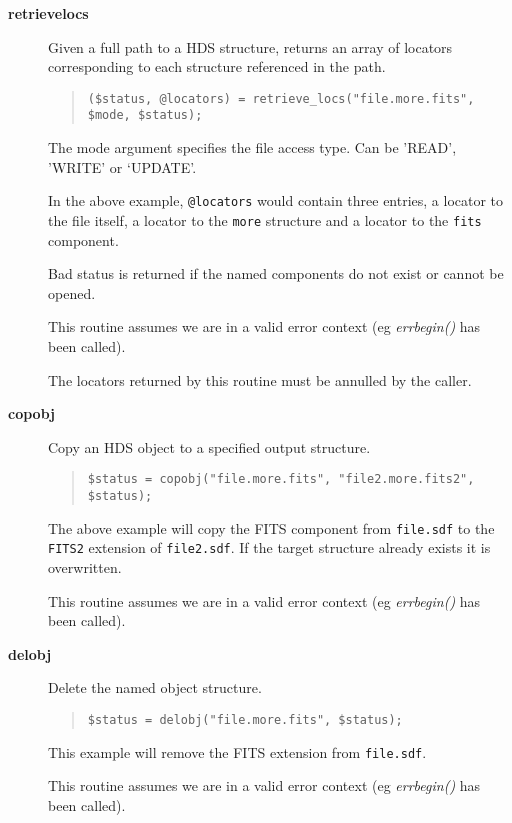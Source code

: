 \documentclass[twoside,11pt]{article}
\newenvironment{myquote}{\begin{quote}\begin{small}}{\end{small}\end{quote}}
\renewcommand{\_}{\texttt{\symbol{95}}}
\begin{document}
\begin{description}

\item[{\bf retrieve\_locs}] \mbox{}

Given a full path to a HDS structure, returns an array of 
locators corresponding to each structure referenced in the path.
\begin{myquote}
\begin{verbatim}
($status, @locators) = retrieve_locs("file.more.fits", $mode, $status);
\end{verbatim}
\end{myquote} %

The mode argument specifies the file access type. Can be 'READ', 'WRITE'
or `UPDATE'.

In the above example, {\tt @locators} would contain three entries,
a locator to the file itself, a locator to the {\tt more} structure
and a locator to the {\tt fits} component.

Bad status is returned if the named components do not exist or cannot
be opened.

This routine assumes we are in a valid error context (eg {\em err\_begin()\/}
has been called).

The locators returned by this routine must be annulled by the caller.

\item[{\bf copobj}] \mbox{}

Copy an HDS object to a specified output structure.
\begin{myquote}
\begin{verbatim}
$status = copobj("file.more.fits", "file2.more.fits2", $status);
\end{verbatim}
\end{myquote}

The above example will copy the FITS component from {\tt file.sdf} to
the {\tt FITS2} extension of {\tt file2.sdf}. If the target structure
already exists it is overwritten.

This routine assumes we are in a valid error context (eg {\em err\_begin()\/}
has been called).

\item[{\bf delobj}] \mbox{}

Delete the named object structure.
\begin{myquote}
\begin{verbatim}
$status = delobj("file.more.fits", $status);
\end{verbatim}
\end{myquote}

This example will remove the FITS extension from {\tt file.sdf}.

This routine assumes we are in a valid error context (eg {\em err\_begin()\/}
has been called).

\end{description}
\end{document}
